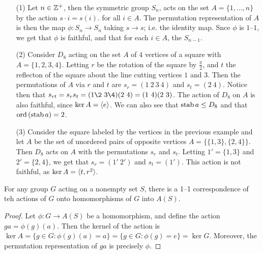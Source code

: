 \begin{example}\label{4.2}
    \begin{enumerate}
        \item[(1)] Let $n \in \mathbb{Z}^+$, then the symmetric group $S_n$, acts on the
            set $A=\{1, \dots, n\}$ by the action $s \cdot i=s(i)$. for all $i
            \in A$. The permutation representation of $A$ is then the map
            $\phi:S_n \rightarrow S_n$ taking $s \rightarrow s$; i.e. the
            identity map. Snce $\phi$ is  $1$--$1$, we get that $\phi$ is
            faithful, and that for each $i \in A$, the  \simeq
            $S_{n-1}$.

        \item[(2)] Consider $D_8$ acting on the set $A$ of  $4$ vertices of a
        square with  $A=\{1,2,3,4\}$. Letting $r$ be the rotation of the square
        by  $\frac{\pi}{2}$, and $t$ the reflecton of the square about the
        line cutting vertices $1$ and $3$. Then the permutations of $A$ via
        $r$ and  $t$ are  $s_r=(1 \ 2 \ 3 \ 4)$ and $s_t = (2 \ 4)$. Notice then
        that $s_{rt}=s_rs_t=(1 \2 \ 3 \4)(2 \ 4)=(1 \ 4)(2 \ 3)$. The action of
        $D_8$ on $A$ is also faithful, since  $\ker{A}=\langle e\rangle$. We can also
        see that $\operatorname{stab}{a} \leq D_8$ and that $\operatorname{ord}{(\operatorname{stab}{a})}=2$.

    \item[(3)] Consider the square labeled by the vertices in the
        previous example and let $A$ be the set of unordered pairs of opposite
        vertices  $A=\{\{1,3\}, \{2,4\}\}$. Then $D_8$ acts on $A$ with the
        permutations $s_r$ and  $s_t$. Letting  $1'=\{1,3\}$ and $2'=\{2,4\}$,
        we get that $s_r=(1' \ 2')$ and $s_t=(1')$. This action is not faithful,
        as $\ker{A}=\langle t,r^2\rangle$.
    \end{enumerate}
\end{example}

\begin{theorem}\label{4.1.3}
    For any group $G$ acting on a nonempty set $S$, there is a 1--1 correspondence
    of teh actions of  $G$ onto homomorphisms of  $G$ into $A(S)$.
\end{theorem}
\begin{proof}
    Let $\phi:G \rightarrow A(S)$ be a homomorphism, and define the action
    $ga=\phi(g)(a)$. Then the kernel of the action is $\ker{A}=\{g \in G :
    \phi(g)(a)=a\}=\{g \in G : \phi(g)=e\}=\ker{G}$. Moreover, the permutation
    representation of $ga$ is precisely  $\phi$.
\end{proof}

